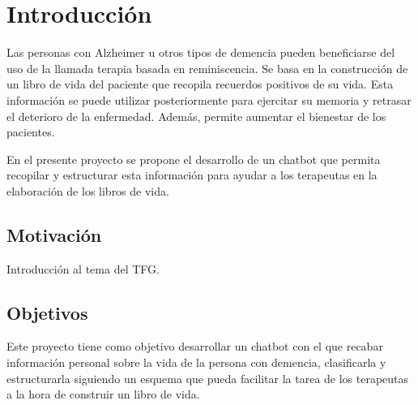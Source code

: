 \chapter{Introducción}
\label{cap:introduccion}



Las personas con Alzheimer u otros tipos de demencia pueden beneficiarse del uso de la llamada terapia basada en reminiscencia. Se basa en la construcción de un libro de vida del paciente que recopila recuerdos positivos de su vida. Esta información se puede utilizar posteriormente para ejercitar su memoria y retrasar el deterioro de la enfermedad. Además, permite aumentar el bienestar de los pacientes.

En el presente proyecto se propone el desarrollo de un chatbot que permita recopilar y estructurar esta información para ayudar a los terapeutas en la elaboración de los libros de vida.


\section{Motivación}
Introducción al tema del TFG.


\section{Objetivos}

Este proyecto tiene como objetivo desarrollar un chatbot con el que recabar información personal sobre la vida de la persona con demencia, clasificarla y estructurarla siguiendo un esquema que pueda facilitar la tarea de los terapeutas a la hora de construir un libro de vida. 


